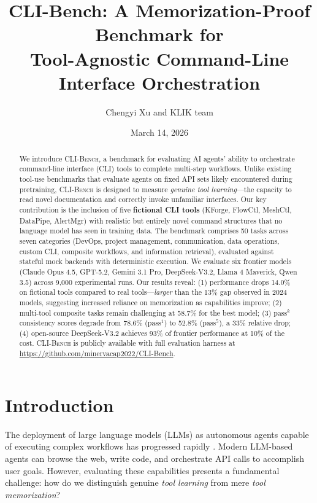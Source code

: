 \documentclass{article}
\title{CLI-Bench: A Memorization-Proof Benchmark for\\Tool-Agnostic Command-Line Interface Orchestration}
\author{
  Chengyi Xu and KLIK team\\
}
\date{March 14, 2026}
\newcommand{\clibench}{\textsc{CLI-Bench}}
\newcommand{\passmark}{\text{pass}^k}
\begin{document}
\maketitle

\begin{abstract}
We introduce \clibench{}, a benchmark for evaluating AI agents' ability to orchestrate command-line interface (CLI) tools to complete multi-step workflows. Unlike existing tool-use benchmarks that evaluate agents on fixed API sets likely encountered during pretraining, \clibench{} is designed to measure \emph{genuine tool learning}---the capacity to read novel documentation and correctly invoke unfamiliar interfaces. Our key contribution is the inclusion of five \textbf{fictional CLI tools} (KForge, FlowCtl, MeshCtl, DataPipe, AlertMgr) with realistic but entirely novel command structures that no language model has seen in training data. The benchmark comprises 50 tasks across seven categories (DevOps, project management, communication, data operations, custom CLI, composite workflows, and information retrieval), evaluated against stateful mock backends with deterministic execution. We evaluate six frontier models (Claude Opus 4.5, GPT-5.2, Gemini 3.1 Pro, DeepSeek-V3.2, Llama 4 Maverick, Qwen 3.5) across 9,000 experimental runs. Our results reveal: (1) performance drops 14.0\% on fictional tools compared to real tools---\emph{larger} than the 13\% gap observed in 2024 models, suggesting increased reliance on memorization as capabilities improve; (2) multi-tool composite tasks remain challenging at 58.7\% for the best model; (3) $\passmark$ consistency scores degrade from 78.6\% (pass$^1$) to 52.8\% (pass$^5$), a 33\% relative drop; (4) open-source DeepSeek-V3.2 achieves 93\% of frontier performance at 10\% of the cost. \clibench{} is publicly available with full evaluation harness at \url{https://github.com/minervacap2022/CLI-Bench}.
\end{abstract}

\section{Introduction}
\label{sec:intro}

The deployment of large language models (LLMs) as autonomous agents capable of executing complex workflows has progressed rapidly \citep{agentbench2023, webarena2023}. Modern LLM-based agents can browse the web, write code, and orchestrate API calls to accomplish user goals. However, evaluating these capabilities presents a fundamental challenge: how do we distinguish genuine \emph{tool learning} from mere \emph{tool memorization}?
\end{document}
